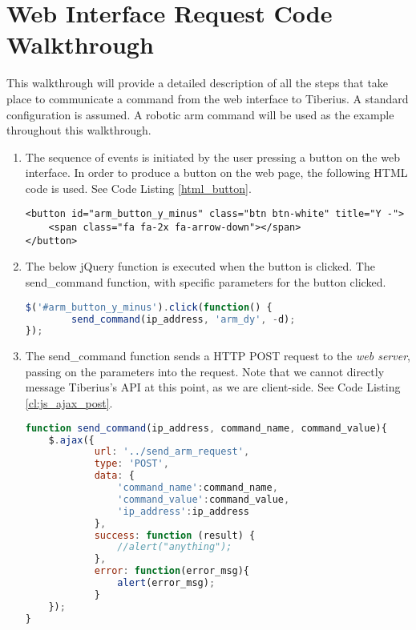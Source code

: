 \chapter{Web Interface Request Code Walkthrough}
\label{app:web_walkthrough}
\pagestyle{cameron}

This walkthrough will provide a detailed description of all the steps that take place to communicate a command from the web interface to Tiberius. A standard configuration is assumed. A robotic arm command will be used as the example throughout this walkthrough.
\newline

\begin{enumerate}

\item The sequence of events is initiated by the user pressing a button on the web interface. In order to produce a button on the web page, the following \gls{HTML} code is used. See Code Listing \ref{html_button}. 
\newline

\begin{lstlisting}[caption=HTML Button, label=html_button]
<button id="arm_button_y_minus" class="btn btn-white" title="Y -">
    <span class="fa fa-2x fa-arrow-down"></span>
</button>
\end{lstlisting}

\item The below jQuery function is executed when the button is clicked. The send\_command function, with specific parameters for the button clicked.
\newline

\begin{lstlisting}[language=JavaScript, caption=jQuery Click Listener, label=cl:button_listener]
$('#arm_button_y_minus').click(function() {
		send_command(ip_address, 'arm_dy', -d);
});
\end{lstlisting}

\item The send\_command function sends a \gls{HTTP} \gls{POST} request to the \textit{web server}, passing on the parameters into the request. Note that we cannot directly message Tiberius's API at this point, as we are client-side. See Code Listing \ref{cl:js_ajax_post}.
\newline

\begin{lstlisting}[language=JavaScript, caption=Javascript message to web server, label=cl:js_ajax_post]
function send_command(ip_address, command_name, command_value){
	$.ajax({
			url: '../send_arm_request',
			type: 'POST',
			data: {
				'command_name':command_name,
				'command_value':command_value,
				'ip_address':ip_address
			},
			success: function (result) {
				//alert("anything");
			},
			error: function(error_msg){
				alert(error_msg);
			}
	});
}
\end{lstlisting}


\end{enumerate}
